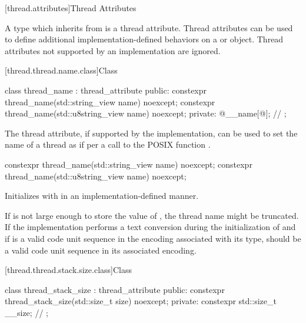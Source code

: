 \documentclass{wg21}
\begin{document}
\begin{addedblock}

[thread.attributes]{Thread Attributes}

A type which inherits from  is a thread attribute.
Thread attributes can be used to define additional implementation-defined behaviors on a  or  object.
Thread attributes not supported by an implementation are ignored.

[thread.thread.name.class]{Class }

\begin{codeblock}
class thread_name : thread_attribute {
public:
    constexpr thread_name(std::string_view name) noexcept;
    constexpr thread_name(std::u8string_view name) noexcept;
private:
    @\impdefnc@ __name[@\impdefnc@]; // \expos
};
\end{codeblock}

\recommended

The  thread attribute, if supported by the implementation, can be used
to set the name of a thread as if per a call to the POSIX function .

\begin{itemdecl}
constexpr thread_name(std::string_view name) noexcept;
constexpr thread_name(std::u8string_view name) noexcept;
\end{itemdecl}

\begin{itemdescr}
\effects Initializes  with  in an implementation-defined manner.

\recommended If  is not large enough to store the value of ,
             the thread name might be truncated. If the implementation performs a text conversion
             during the initialization of  and if  is a valid code unit sequence
             in the encoding associated with its type,  should be a valid code unit sequence in its
             associated encoding.
\end{itemdescr}

[thread.thread.stack.size.class]{Class }

\begin{codeblock}
class thread_stack_size : thread_attribute {
public:
    constexpr thread_stack_size(std::size_t size) noexcept;
private:
    constexpr std::size_t __size; // \expos
};
\end{codeblock}


\end{addedblock}
\end{document}
